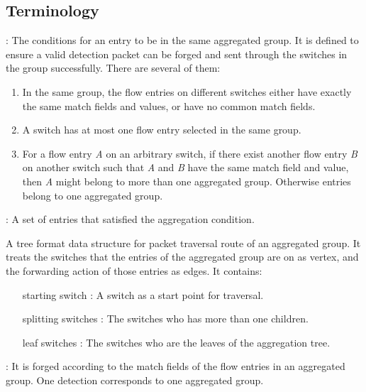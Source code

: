 \subsection{Terminology}

\begin{description}%
\item
[Aggregation conditions]:
The conditions for an entry to be in the same aggregated group. It is defined to ensure a valid detection packet can be forged and sent through the switches in the group successfully. There are several of them:
\begin{enumerate}[label={\arabic*)}]
\item
In the same group, the flow entries on different switches either have exactly the same match fields and values, or have no common match fields.
\item
A switch has at most one flow entry selected in the same group. 
\item
For a flow entry \textit{A} on an arbitrary switch, if there exist another flow entry \textit{B} on another switch such that \textit{A} and \textit{B} have the same match field and value, then \textit{A} might belong to more than one aggregated group. Otherwise entries belong to one aggregated group.
\end{enumerate}


\item
[Aggregated groups]: 
A set of entries that satisfied the aggregation condition. 

\item 
[Aggregation tree]
A tree format data structure for packet traversal route of an aggregated group. It treats the switches that the entries of the aggregated group are on as vertex, and the forwarding action of those entries as edges. It contains:
\begin{enumerate}
\item
[starting switch]:
A switch as a start point for traversal.
\item
[splitting switches]:
The switches who has more than one children. 
\item
[leaf switches]:
The switches who are the leaves of the aggregation tree.
\end{enumerate}
\item 

\item
[Detection packets]:
It is forged according to the match fields of the flow entries in an aggregated group. One detection corresponds to one aggregated group.
\end{description}

